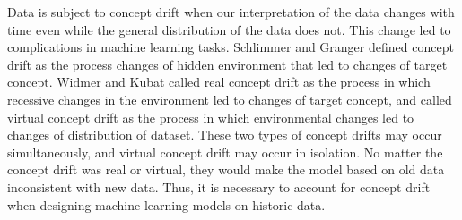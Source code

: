\label{conceptDrift}

Data is subject to concept drift when our interpretation of the data changes with time even while the general distribution of the data does not. This change led to complications in machine learning tasks. Schlimmer and Granger \cite{schlimmer1986incremental} defined concept drift as the process changes of hidden environment that led to changes of target concept. Widmer and Kubat \cite{widmer1996learning} called real concept drift as the process in which recessive changes in the environment led to changes of target concept, and called virtual concept drift as the process in which environmental changes led to changes of distribution of dataset. These two types of concept drifts may occur simultaneously, and virtual concept drift may occur in isolation. No matter the concept drift was real or virtual, they would make the model based on old data inconsistent with new data. Thus, it is necessary to account for concept drift when designing machine learning models on historic data.



